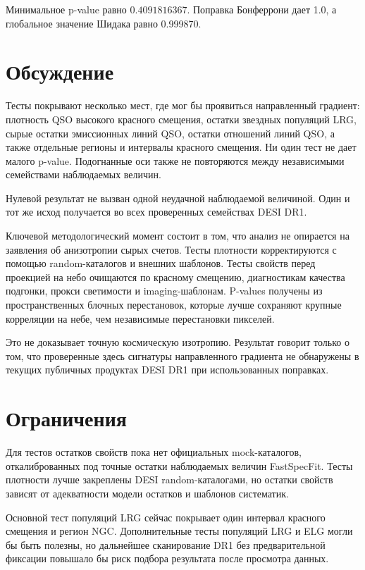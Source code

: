 \documentclass[11pt]{article}
\begin{document}
Минимальное p-value равно $0.4091816367$. Поправка Бонферрони дает 1.0, а глобальное значение Шидака равно 0.999870.

\section{Обсуждение}

Тесты покрывают несколько мест, где мог бы проявиться направленный градиент: плотность QSO высокого красного смещения, остатки звездных популяций LRG, сырые остатки эмиссионных линий QSO, остатки отношений линий QSO, а также отдельные регионы и интервалы красного смещения. Ни один тест не дает малого p-value. Подогнанные оси также не повторяются между независимыми семействами наблюдаемых величин.

Нулевой результат не вызван одной неудачной наблюдаемой величиной. Один и тот же исход получается во всех проверенных семействах DESI DR1.

Ключевой методологический момент состоит в том, что анализ не опирается на заявления об анизотропии сырых счетов. Тесты плотности корректируются с помощью random-каталогов и внешних шаблонов. Тесты свойств перед проекцией на небо очищаются по красному смещению, диагностикам качества подгонки, прокси светимости и imaging-шаблонам. P-values получены из пространственных блочных перестановок, которые лучше сохраняют крупные корреляции на небе, чем независимые перестановки пикселей.

Это не доказывает точную космическую изотропию. Результат говорит только о том, что проверенные здесь сигнатуры направленного градиента не обнаружены в текущих публичных продуктах DESI DR1 при использованных поправках.

\section{Ограничения}

Для тестов остатков свойств пока нет официальных mock-каталогов, откалиброванных под точные остатки наблюдаемых величин FastSpecFit. Тесты плотности лучше закреплены DESI random-каталогами, но остатки свойств зависят от адекватности модели остатков и шаблонов систематик.

Основной тест популяций LRG сейчас покрывает один интервал красного смещения и регион NGC. Дополнительные тесты популяций LRG и ELG могли бы быть полезны, но дальнейшее сканирование DR1 без предварительной фиксации повышало бы риск подбора результата после просмотра данных.
\end{document}

